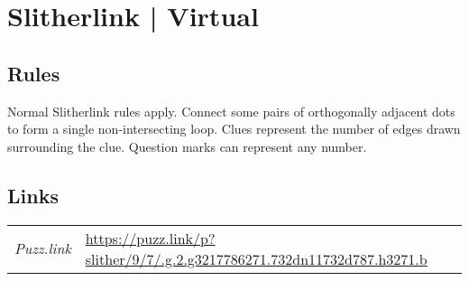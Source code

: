 \section{Slitherlink | {\normalfont Virtual}}
\label{sec:47-slitherlink-virtual}

\subsection*{Rules}
\begin{markdown}
Normal Slitherlink rules apply.  Connect some pairs of orthogonally adjacent dots to form a single non-intersecting loop. Clues represent the number of edges drawn surrounding the clue. Question marks can represent any number.
\end{markdown}
\subsection*{Links}
\begin{tabularx}{\textwidth}{l X}
\emph{Puzz.link} & \url{https://puzz.link/p?slither/9/7/.g.2.g3217786271.732dn11732d787.h3271.b} \\
\end{tabularx}
\pagebreak
